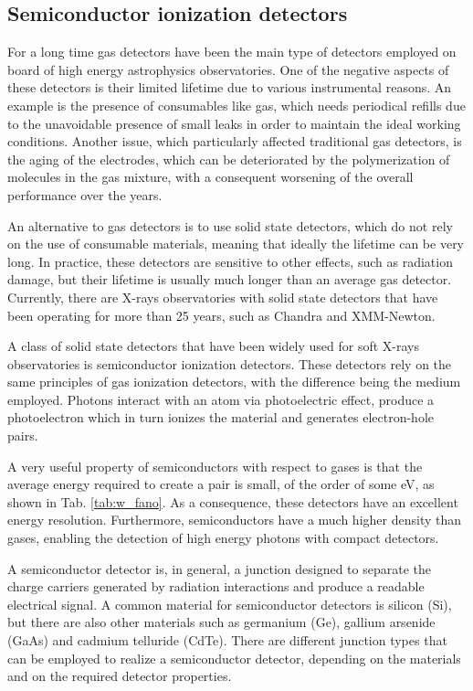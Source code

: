 \subsection{Semiconductor ionization detectors}
\label{sec:semiconductors}

For a long time gas detectors have been the main type of detectors employed on board of high energy astrophysics observatories. One of the negative aspects of these detectors is their limited lifetime due to various instrumental reasons. An example is the presence of consumables like gas, which needs periodical refills due to the unavoidable presence of small leaks in order to maintain the ideal working conditions. Another issue, which particularly affected traditional gas detectors, is the aging of the electrodes, which can be deteriorated by the polymerization of molecules in the gas mixture, with a consequent worsening of the overall performance over the years.

An alternative to gas detectors is to use solid state detectors, which do not rely on the use of consumable materials, meaning that ideally the lifetime can be very long. In practice, these detectors are sensitive to other effects, such as radiation damage, but their lifetime is usually much longer than an average gas detector. Currently, there are X-rays observatories with solid state detectors that have been operating for more than 25 years, such as Chandra and XMM-Newton.

A class of solid state detectors that have been widely used for soft X-rays observatories is semiconductor ionization detectors. These detectors rely on the same principles of gas ionization detectors, with the difference being the medium employed. Photons interact with an atom via photoelectric effect, produce a photoelectron which in turn ionizes the material and generates electron-hole pairs.

A very useful property of semiconductors with respect to gases is that the average energy required to create a pair is small, of the order of some eV, as shown in Tab. \ref{tab:w_fano}. As a consequence, these detectors have an excellent energy resolution. Furthermore, semiconductors have a much higher density than gases, enabling the detection of high energy photons with compact detectors.

A semiconductor detector is, in general, a junction designed to separate the charge carriers generated by radiation interactions and produce a readable electrical signal. A common material for semiconductor detectors is silicon (Si), but there are also other materials such as germanium (Ge), gallium arsenide (GaAs) and cadmium telluride (CdTe). There are different junction types that can be employed to realize a semiconductor detector, depending on the materials and on the required detector properties.

